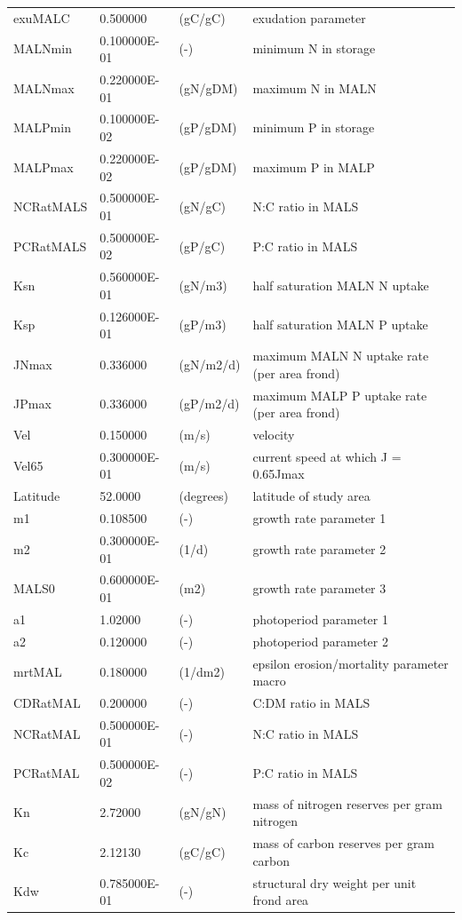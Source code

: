 \documentclass{deltares_manual}
\begin{document}
\begin{longtable}{|l|l|l|l|}
	exuMALC & 0.500000 & (gC/gC) & exudation parameter\\ 
	MALNmin & 0.100000E-01 & (-) & minimum N in storage\\ 
	MALNmax & 0.220000E-01 & (gN/gDM) & maximum N in MALN\\ 
	MALPmin & 0.100000E-02 & (gP/gDM) & minimum P in storage\\ 
	MALPmax & 0.220000E-02 & (gP/gDM) & maximum P in MALP\\ 
	NCRatMALS & 0.500000E-01 & (gN/gC) & N:C ratio in MALS\\ 
	PCRatMALS & 0.500000E-02 & (gP/gC) & P:C ratio in MALS\\ 
	Ksn & 0.560000E-01 & (gN/m3) & half saturation MALN N uptake\\ 
	Ksp & 0.126000E-01 & (gP/m3) & half saturation MALN P uptake\\ 
	JNmax & 0.336000 & (gN/m2/d) & maximum MALN N uptake rate (per area frond)\\ 
	JPmax & 0.336000 & (gP/m2/d) & maximum MALP P uptake rate (per area frond)\\ 
	Vel & 0.150000 & (m/s) & velocity\\ 
	Vel65 & 0.300000E-01 & (m/s) & current speed at which J = 0.65Jmax\\ 
	Latitude & 52.0000 & (degrees) & latitude of study area\\ 
	m1 & 0.108500 & (-) & growth rate parameter 1\\ 
	m2 & 0.300000E-01 & (1/d) & growth rate parameter 2\\ 
	MALS0 & 0.600000E-01 & (m2) & growth rate parameter 3\\ 
	a1 & 1.02000 & (-) & photoperiod parameter 1\\ 
	a2 & 0.120000 & (-) & photoperiod parameter 2\\ 
	mrtMAL & 0.180000 & (1/dm2) & epsilon erosion/mortality parameter macro\\ 
	CDRatMAL & 0.200000 & (-) & C:DM ratio in MALS\\ 
	NCRatMAL & 0.500000E-01 & (-) & N:C ratio in MALS\\ 
	PCRatMAL & 0.500000E-02 & (-) & P:C ratio in MALS\\ 
	Kn & 2.72000 & (gN/gN) & mass of nitrogen reserves per gram nitrogen\\ 
	Kc & 2.12130 & (gC/gC) & mass of carbon reserves per gram carbon\\ 
	Kdw & 0.785000E-01 & (-) & structural dry weight per unit frond area\\ 

\end{longtable}
\end{document}
